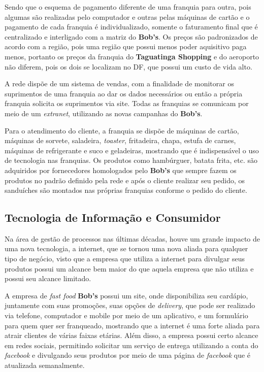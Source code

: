 		Sendo que o esquema de pagamento diferente de uma franquia para outra, pois algumas são realizadas pelo computador e outras pelas máquinas de cartão e o pagamento de cada franquia é individualizado, somente o faturamento final que é centralizado e interligado com a matriz do \textbf{Bob’s}. Os preços são padronizados de acordo com a região, pois uma região que possui menos poder aquisitivo paga menos, portanto os preços da franquia do \textbf{Taguatinga Shopping} e do aeroporto não diferem, pois os dois se localizam no DF, que possui um custo de vida alto.

		A rede dispõe de um sistema de vendas, com a finalidade de monitorar os suprimentos de uma franquia ao dar os dados necessários ou então a própria franquia solicita os suprimentos via site. Todas as franquias se comunicam por meio de um \emph{extranet}, utilizando as novas campanhas do \textbf{Bob’s}.

		Para o atendimento do cliente, a franquia se dispõe de máquinas de cartão, máquinas de sorvete, saladeira, \emph{toaster}, fritadeira, chapa, estufa de carnes, máquinas de refrigerante e suco e geladeiras, mostrando que é indispensável o uso de tecnologia nas franquias. Os produtos como hambúrguer, batata frita, etc. são adquiridos por fornecedores homologados pelo \textbf{Bob’s} que sempre fazem os produtos no padrão definido pela rede e após o cliente realizar seu pedido, os sanduíches são montados nas próprias franquias conforme o pedido do cliente.

		\subsection[Tecnologia de Informação e Consumidor]{Tecnologia de Informação e Consumidor}
		\label{sec:tecnologias_tic}

			Na área de gestão de processos nas últimas décadas, houve um grande impacto de uma nova tecnologia, a internet, que se tornou uma nova aliada para qualquer tipo de negócio, visto que a empresa que utiliza a internet para divulgar seus produtos possui um alcance bem maior do que aquela empresa que não utiliza e possui seu alcance limitado. \cite{slack}

			A empresa de \emph{fast food} \textbf{Bob’s} possui um site, onde disponibiliza seu cardápio, juntamente com suas promoções, suas opções de \emph{delivery}, que pode ser realizado via telefone, computador e mobile por meio de um aplicativo, e um formulário para quem quer ser franqueado, mostrando que a internet é uma forte aliada para atrair clientes de várias faixas etárias. Além disso, a empresa possui certo alcance em redes sociais, permitindo solicitar um serviço de entrega utilizando a conta do \emph{facebook} e divulgando seus produtos por meio de uma página de \emph{facebook} que é atualizada semanalmente.
		
